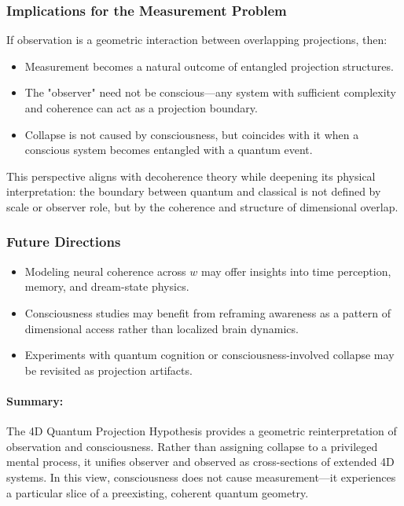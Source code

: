 \documentclass[12pt]{article}
\begin{document}
\subsubsection*{Implications for the Measurement Problem}

If observation is a geometric interaction between overlapping projections, then:

\begin{itemize}
    \item Measurement becomes a natural outcome of entangled projection structures.
    \item The "observer" need not be conscious—any system with sufficient complexity and coherence can act as a projection boundary.
    \item Collapse is not caused by consciousness, but coincides with it when a conscious system becomes entangled with a quantum event.
\end{itemize}

This perspective aligns with decoherence theory while deepening its physical interpretation: the boundary between quantum and classical is not defined by scale or observer role, but by the coherence and structure of dimensional overlap.

\subsubsection*{Future Directions}

\begin{itemize}
    \item Modeling neural coherence across \( w \) may offer insights into time perception, memory, and dream-state physics.
    \item Consciousness studies may benefit from reframing awareness as a pattern of dimensional access rather than localized brain dynamics.
    \item Experiments with quantum cognition or consciousness-involved collapse may be revisited as projection artifacts.
\end{itemize}

\paragraph{Summary:} The 4D Quantum Projection Hypothesis provides a geometric reinterpretation of observation and consciousness. Rather than assigning collapse to a privileged mental process, it unifies observer and observed as cross-sections of extended 4D systems. In this view, consciousness does not cause measurement—it experiences a particular slice of a preexisting, coherent quantum geometry.
\end{document}
